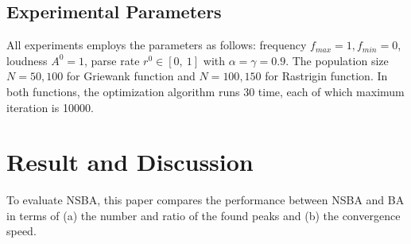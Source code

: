 \documentclass{ies2018}
\begin{document}
\subsection{Experimental Parameters}
All experiments employs the parameters as follows: frequency ${f_{max}=1, f_{min}=0}$, loudness ${A^0}=1$, parse rate ${r^0} \in [0, \ 1]$ with ${\alpha =\gamma = 0.9}$. The population size ${N=50,100}$ for Griewank function and $N=100,150$ for Rastrigin function. In both functions, the optimization algorithm runs 30 time, each of which maximum iteration is 10000.

\section{Result and Discussion}
To evaluate NSBA, this paper compares the performance between NSBA and BA in terms of (a) the number and ratio of the found peaks and (b) the convergence speed.
\end{document}
